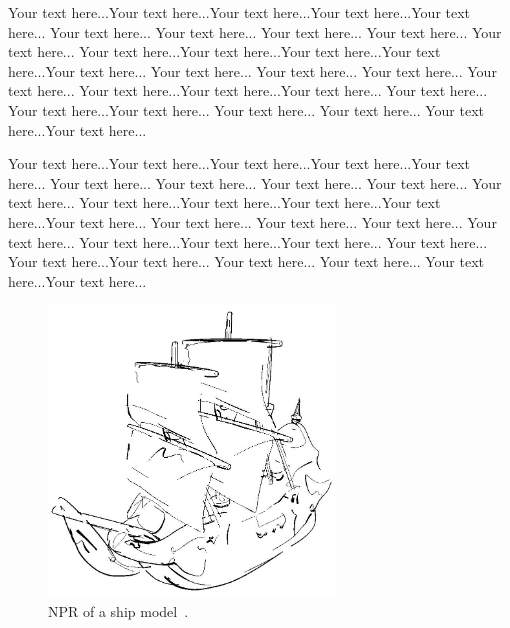 \documentclass[accepted,single]{gipaper}
\begin{document}
Your text here...Your text here...Your text here...Your text
here...Your text here... Your text here... Your text here... Your
text here... Your text here... Your text here... Your text
here...Your text here...Your text here...Your text here...Your
text here... Your text here... Your text here... Your text here...
Your text here... Your text here...Your text here...Your text
here... Your text here... Your text here...Your text here... Your
text here... Your text here... Your text here...Your text here...

Your text here...Your text here...Your text here...Your text
here...Your text here... Your text here... Your text here... Your
text here... Your text here... Your text here... Your text
here...Your text here...Your text here...Your text here...Your
text here... Your text here... Your text here... Your text here...
Your text here... Your text here...Your text here...Your text
here... Your text here... Your text here...Your text here... Your
text here... Your text here... Your text here...Your text here...


\begin{figure}[htpb]
\centering
\includegraphics[width=3in]{figs/res/sketch/ship.png}
\caption{
    NPR of a ship model~\cite{Sousa_Przemek_CGF:2003}.
} \label{fig1}
\end{figure}

\end{document}
